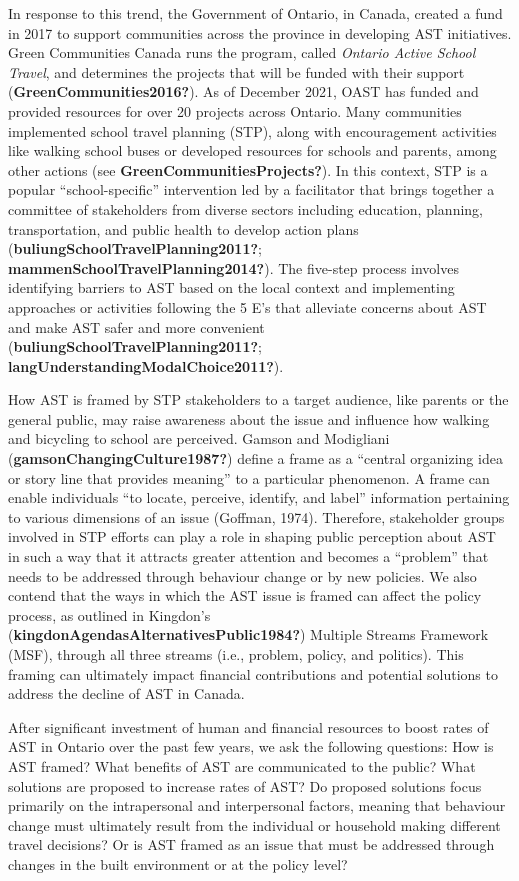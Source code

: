\documentclass[]{elsarticle} %
\begin{document}
In response to this trend, the Government of Ontario, in Canada, created
a fund in 2017 to support communities across the province in developing
AST initiatives. Green Communities Canada runs the program, called
\emph{Ontario Active School Travel}, and determines the projects that
will be funded with their support (\textbf{GreenCommunities2016?}). As
of December 2021, OAST has funded and provided resources for over 20
projects across Ontario. Many communities implemented school travel
planning (STP), along with encouragement activities like walking school
buses or developed resources for schools and parents, among other
actions (see \textbf{GreenCommunitiesProjects?}). In this context, STP
is a popular ``school-specific'' intervention led by a facilitator that
brings together a committee of stakeholders from diverse sectors
including education, planning, transportation, and public health to
develop action plans (\textbf{buliungSchoolTravelPlanning2011?};
\textbf{mammenSchoolTravelPlanning2014?}). The five-step process
involves identifying barriers to AST based on the local context and
implementing approaches or activities following the 5 E's that alleviate
concerns about AST and make AST safer and more convenient
(\textbf{buliungSchoolTravelPlanning2011?};
\textbf{langUnderstandingModalChoice2011?}).

How AST is framed by STP stakeholders to a target audience, like parents
or the general public, may raise awareness about the issue and influence
how walking and bicycling to school are perceived. Gamson and Modigliani
(\textbf{gamsonChangingCulture1987?}) define a frame as a ``central
organizing idea or story line that provides meaning'' to a particular
phenomenon. A frame can enable individuals ``to locate, perceive,
identify, and label'' information pertaining to various dimensions of an
issue (Goffman, 1974). Therefore, stakeholder groups involved in STP
efforts can play a role in shaping public perception about AST in such a
way that it attracts greater attention and becomes a ``problem'' that
needs to be addressed through behaviour change or by new policies. We
also contend that the ways in which the AST issue is framed can affect
the policy process, as outlined in Kingdon's
(\textbf{kingdonAgendasAlternativesPublic1984?}) Multiple Streams
Framework (MSF), through all three streams (i.e., problem, policy, and
politics). This framing can ultimately impact financial contributions
and potential solutions to address the decline of AST in Canada.

After significant investment of human and financial resources to boost
rates of AST in Ontario over the past few years, we ask the following
questions: How is AST framed? What benefits of AST are communicated to
the public? What solutions are proposed to increase rates of AST? Do
proposed solutions focus primarily on the intrapersonal and
interpersonal factors, meaning that behaviour change must ultimately
result from the individual or household making different travel
decisions? Or is AST framed as an issue that must be addressed through
changes in the built environment or at the policy level?
\end{document}
